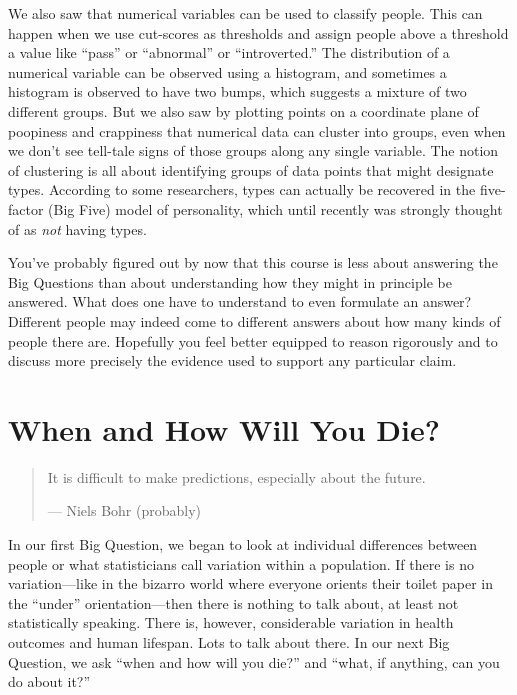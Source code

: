 \documentclass[openany]{book}
\begin{document}
We also saw that numerical variables can be used to classify people. This can happen when we use cut-scores as thresholds and assign people above a threshold a value like ``pass'' or ``abnormal'' or ``introverted.'' The distribution of a numerical variable can be observed using a histogram, and sometimes a histogram is observed to have two bumps, which suggests a mixture of two different groups. But we also saw by plotting points on a coordinate plane of poopiness and crappiness that numerical data can cluster into groups, even when we don't see tell-tale signs of those groups along any single variable. The notion of clustering is all about identifying groups of data points that might designate types. According to some researchers, types can actually be recovered in the five-factor (Big Five) model of personality, which until recently was strongly thought of as \emph{not} having types.

You've probably figured out by now that this course is less about answering the Big Questions than about understanding how they might in principle be answered. What does one have to understand to even formulate an answer? Different people may indeed come to different answers about how many kinds of people there are. Hopefully you feel better equipped to reason rigorously and to discuss more precisely the evidence used to support any particular claim.

\hypertarget{when-and-how-will-you-die}{%
\chapter{When and How Will You Die?}\label{when-and-how-will-you-die}}

\begin{quote}
It is difficult to make predictions, especially about the future.

--- Niels Bohr (probably)
\end{quote}

In our first Big Question, we began to look at individual differences between people or what statisticians call variation within a population. If there is no variation---like in the bizarro world where everyone orients their toilet paper in the ``under'' orientation---then there is nothing to talk about, at least not statistically speaking. There is, however, considerable variation in health outcomes and human lifespan. Lots to talk about there. In our next Big Question, we ask ``when and how will you die?'' and ``what, if anything, can you do about it?''
\end{document}
